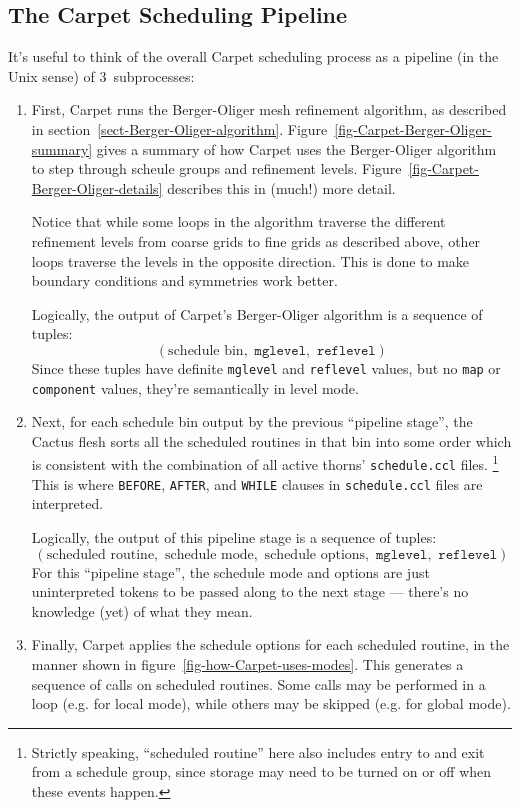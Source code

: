 \documentclass{article}
\def\thorn#1{\textbf{#1}}
\def\eg{e.g.\hbox{}}
\begin{document}

\subsection{The \thorn{Carpet} Scheduling Pipeline}
\label{sect-Carpet-scheduling-pipeline}

It's useful to think of the overall Carpet scheduling process as a
pipeline (in the Unix sense) of 3~subprocesses:
\begin{enumerate}
\item	First, Carpet runs the Berger-Oliger mesh refinement algorithm,
	as described in section~\ref{sect-Berger-Oliger-algorithm}.
	Figure~\ref{fig-Carpet-Berger-Oliger-summary} gives a summary
	of how Carpet uses the Berger-Oliger algorithm to step through
	scheule groups and refinement levels.
	 Figure~\ref{fig-Carpet-Berger-Oliger-details} describes this
	in (much!) more detail.

	Notice that while some loops in the algorithm traverse the
	different refinement levels from coarse grids to fine grids
	as described above, other loops traverse the levels in the
	opposite direction.  This is done to make boundary conditions
	and symmetries work better.

	Logically, the output of Carpet's Berger-Oliger algorithm
	is a sequence of tuples:
	$$
	(\textrm{schedule bin},\,\,\texttt{mglevel},\,\,\texttt{reflevel})
	$$
	Since these tuples have definite \texttt{mglevel}
	and \texttt{reflevel} values, but no \texttt{map} or
	\texttt{component} values, they're semantically in level
	mode.
\item	Next, for each schedule bin output by the previous
	``pipeline stage'', the Cactus flesh sorts all the
	scheduled routines in that bin into some order which is
	consistent with the combination of all active thorns'
	\verb|schedule.ccl| files.%
\footnote{%
	 Strictly speaking, ``scheduled routine'' here also
	 includes entry to and exit from a schedule group,
	 since storage may need to be turned on or off when
	 these events happen.
	 }%
{}	This is where \verb|BEFORE|,
	\verb|AFTER|, and \verb|WHILE| clauses in \verb|schedule.ccl|
	files are interpreted.

	Logically, the output of this pipeline stage is a sequence
	of tuples:
	$$
	(\textrm{scheduled routine},\,\,
	 \textrm{schedule mode},\,\, \textrm{schedule options},\,\,
	 \texttt{mglevel},\,\, \texttt{reflevel})
	$$
	For this ``pipeline stage'', the schedule mode and options
	are just uninterpreted tokens to be passed along to the next
	stage --- there's no knowledge (yet) of what they mean.
\item	Finally, Carpet applies the schedule options for each
	scheduled routine, in the manner shown in
	figure~\ref{fig-how-Carpet-uses-modes}.  This generates
	a sequence of calls on scheduled routines.  Some calls
	may be performed in a loop (\eg{} for local mode), while
	others may be skipped (\eg{} for global mode).
\end{enumerate}
\end{document}
